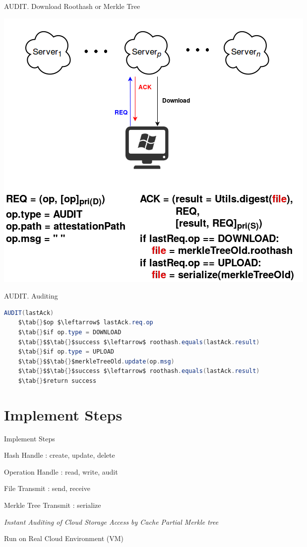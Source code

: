 \documentclass{beamer}
\newcommand{\RNum}[1]{\uppercase\expandafter{\romannumeral #1\relax}}
\newcommand{\tab}[1]{\hspace{.1\textwidth}\rlap{#1}}
\begin{document}
\begin{CJK}{UTF8}{bkai}
\begin{frame}{AUDIT}{\RNum{2}. Download Roothash or Merkle Tree}
	\begin{center}
	\includegraphics[width=.65\textwidth]{Audit2.png}
	\end{center}
\end{frame}

\begin{frame}[fragile]{AUDIT}{\RNum{3}. Auditing}
	\begin{center}
	\begin{minipage}{.9\hsize}
	\begin{lstlisting}[mathescape, language=Java, caption=Audit algorithm]
	AUDIT(lastAck)
	$\tab{}$op $\leftarrow$ lastAck.req.op
	$\tab{}$if op.type = DOWNLOAD
	$\tab{}$$\tab{}$success $\leftarrow$ roothash.equals(lastAck.result)
	$\tab{}$if op.type = UPLOAD
	$\tab{}$$\tab{}$merkleTreeOld.update(op.msg)
	$\tab{}$$\tab{}$success $\leftarrow$ roothash.equals(lastAck.result)
	$\tab{}$return success
	\end{lstlisting}
	\end{minipage}
	\end{center}
\end{frame}

\section{Implement Steps}
\begin{frame}{Implement Steps}
	\begin{enumerate}
	{\color{blue}
	\item Hash Handle : create, update, delete
	\item Operation Handle : read, write, audit
	\item File Transmit : send, receive
	\item Merkle Tree Transmit : serialize}
	\item \alert{\it Instant Auditing of Cloud Storage Access by Cache Partial Merkle tree}
	\item Run on Real Cloud Environment (VM)
	\end{enumerate}
\end{frame}


\end{CJK}
\end{document}
